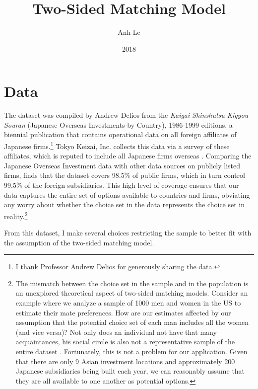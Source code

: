 \message{ !name(AnhLe_dissertation.tex)}\documentclass[]{dukedissertation}
\author{Anh Le}
\title{Two-Sided Matching Model}
\date{2018} %
\begin{document}
\section{Data}

The dataset was compiled by Andrew Delios from the \textit{Kaigai Shinshutsu
  Kigyou Souran} (Japanese Overseas Investments-by Country), 1986-1999 editions,
a biennial publication that contains operational data on all foreign affiliates
of Japanese firms.\footnote{I thank Professor Andrew Delios for generously
  sharing the data.} Tokyo Keizai, Inc. collects this data via a survey of these
affiliates, which is reputed to include all Japanese firms overseas
\citep{Yamawaki1991}. Comparing the Japanese Overseas Investment data with other
data sources on publicly listed firms, \citep{Delios2001} finds that the dataset
covers 98.5\% of public firms, which in turn control 99.5\% of the foreign
subsidiaries. This high level of coverage ensures that our data captures the
entire set of options available to countries and firms, obviating any worry
about whether the choice set in the data represents the choice set in
reality.\footnote{The mismatch between the choice set in the sample and in the
  population is an unexplored theoretical aspect of two-sided matching models.
  Consider an example where we analyze a sample of 1000 men and women in the US
  to estimate their mate preferences. How are our estimates affected by our
  assumption that the potential choice set of each man includes all the women
  (and vice versa)? Not only does an individual not have that many
  acquaintances, his social circle is also not a representative sample of the
  entire dataset \citep[568]{Logan2008}. Fortunately, this is not a problem for
  our application. Given that there are only 9 Asian investment locations and
  approximately 200 Japanese subsidiaries being built each year, we can
  reasonably assume that they are all available to one another as potential
  options.}

From this dataset, I make several choices restricting the sample to better fit
with the assumption of the two-sided matching model.
\end{document}
